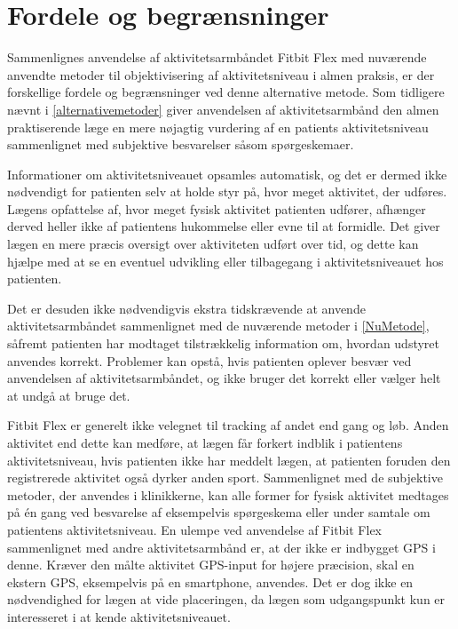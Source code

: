 \section{Fordele og begrænsninger}
Sammenlignes anvendelse af aktivitetsarmbåndet Fitbit Flex med nuværende anvendte metoder til objektivisering af aktivitetsniveau i almen praksis, er der forskellige fordele og begrænsninger ved denne alternative metode. Som tidligere nævnt i \autoref{alternativemetoder} giver anvendelsen af aktivitetsarmbånd den almen praktiserende læge en mere nøjagtig vurdering af en patients aktivitetsniveau sammenlignet med subjektive besvarelser såsom spørgeskemaer.

Informationer om aktivitetsniveauet opsamles automatisk, og det er dermed ikke nødvendigt for patienten selv at holde styr på, hvor meget aktivitet, der udføres. Lægens opfattelse af, hvor meget fysisk aktivitet patienten udfører, afhænger derved heller ikke af patientens hukommelse eller evne til at formidle. Det giver lægen en mere præcis oversigt over aktiviteten udført over tid, og dette kan hjælpe med at se en eventuel udvikling eller tilbagegang i aktivitetsniveauet hos patienten. 

Det er desuden ikke nødvendigvis ekstra tidskrævende at anvende aktivitetsarmbåndet sammenlignet med de nuværende metoder i \autoref{NuMetode}, såfremt patienten har modtaget tilstrækkelig information om, hvordan udstyret anvendes korrekt. Problemer kan opstå, hvis patienten oplever besvær ved anvendelsen af aktivitetsarmbåndet, og ikke bruger det korrekt eller vælger helt at undgå at bruge det.

Fitbit Flex er generelt ikke velegnet til tracking af andet end gang og løb. Anden aktivitet end dette kan medføre, at lægen får forkert indblik i patientens aktivitetsniveau, hvis patienten ikke har meddelt lægen, at patienten foruden den registrerede aktivitet også dyrker anden sport. Sammenlignet med de subjektive metoder, der anvendes i klinikkerne, kan alle former for fysisk aktivitet medtages på én gang ved besvarelse af eksempelvis spørgeskema eller under samtale om patientens aktivitetsniveau.
En ulempe ved anvendelse af Fitbit Flex sammenlignet med andre aktivitetsarmbånd er, at der ikke er indbygget GPS i denne. Kræver den målte aktivitet GPS-input for højere præcision, skal en ekstern GPS, eksempelvis på en smartphone, anvendes. Det er dog ikke en nødvendighed for lægen at vide placeringen, da lægen som udgangspunkt kun er interesseret i at kende aktivitetsniveauet.

